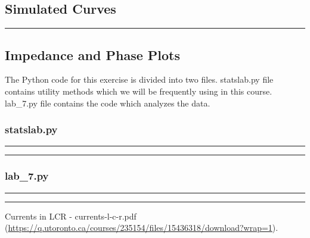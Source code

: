 \documentclass[a4paper,12pt]{article}
\begin{document}
\subsection{Simulated Curves}


\noindent\rule{\textwidth}{1pt}

\pagebreak

\subsection{Impedance and Phase Plots}

The Python code for this exercise is divided into two files. statslab.py file contains utility methods
which we will be frequently using in this course. lab\_7.py file contains the code which analyzes
the data.

\subsubsection{statslab.py}
\noindent\rule{\textwidth}{1pt}

\noindent\rule{\textwidth}{1pt}

\pagebreak

\subsubsection{lab\_7.py}
\noindent\rule{\textwidth}{1pt}

\noindent\rule{\textwidth}{1pt}


\pagebreak

\begin{thebibliography}{99}

 Currents in LCR - currents-l-c-r.pdf (\url{https://q.utoronto.ca/courses/235154/files/15436318/download?wrap=1}).

\end{thebibliography}
\end{document}
